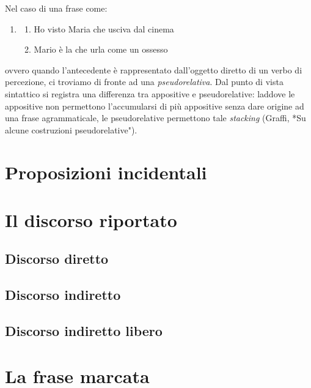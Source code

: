 \documentclass[
  a4paper,
  twoside,
  11pt,
  chapterprefix=false,
  bibliography=totocnumbered,
  listof=flat]{scrbook}
\providecommand{\tightlist}{%
  \setlength{\itemsep}{0pt}\setlength{\parskip}{0pt}}
\begin{document}
Nel caso di una frase come:

\begin{enumerate}
\def\labelenumi{(\arabic{enumi})}
\setcounter{enumi}{127}
\item
  \begin{enumerate}
  \def\labelenumii{\alph{enumii}.}
  \tightlist
  \item
    Ho visto Maria che usciva dal cinema
  \item
    Mario è la che urla come un ossesso
  \end{enumerate}
\end{enumerate}

ovvero quando l'antecedente è rappresentato dall'oggetto diretto di un verbo di percezione, ci troviamo di fronte ad una \emph{pseudorelativa}.
Dal punto di vista sintattico si registra una differenza tra appositive e pseudorelative: laddove le appositive non permettono l'accumularsi di più appositive senza dare origine ad una frase agrammaticale, le pseudorelative permettono tale \emph{stacking} (Graffi, *Su alcune costruzioni pseudorelative").

\hypertarget{proposizioni-incidentali}{%
\chapter{Proposizioni incidentali}\label{proposizioni-incidentali}}

\hypertarget{il-discorso-riportato}{%
\chapter{Il discorso riportato}\label{il-discorso-riportato}}

\hypertarget{discorso-diretto}{%
\section{Discorso diretto}\label{discorso-diretto}}

\hypertarget{discorso-indiretto}{%
\section{Discorso indiretto}\label{discorso-indiretto}}

\hypertarget{discorso-indiretto-libero}{%
\section{Discorso indiretto libero}\label{discorso-indiretto-libero}}

\hypertarget{la-frase-marcata}{%
\chapter{La frase marcata}\label{la-frase-marcata}}

\backmatter
  
\end{document}
